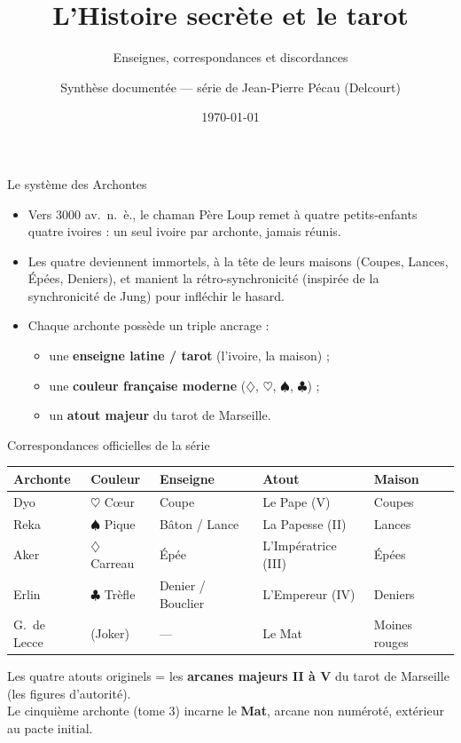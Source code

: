 \documentclass[11pt]{beamer}
\title{L'Histoire secrète et le tarot}
\subtitle{Enseignes, correspondances et discordances}
\author{Synthèse documentée --- série de Jean-Pierre Pécau (Delcourt)}
\date{\today}
\newcommand{\carreau}{\ensuremath{\diamondsuit}}
\newcommand{\coeur}{\ensuremath{\heartsuit}}
\newcommand{\pique}{\ensuremath{\spadesuit}}
\newcommand{\trefle}{\ensuremath{\clubsuit}}
\begin{document}
\begin{frame}
\titlepage
\end{frame}

\begin{frame}{Le système des Archontes}
\begin{itemize}
\item Vers 3000 av.~n.~è., le chaman Père Loup remet à quatre petits-enfants
quatre \og ivoires \fg{} : un seul ivoire par archonte, jamais réunis.
\item Les quatre deviennent immortels, à la tête de leurs \og maisons \fg{}
(Coupes, Lances, Épées, Deniers), et manient la \og rétro-synchronicité \fg{}
(inspirée de la synchronicité de Jung) pour infléchir le hasard.
\item Chaque archonte possède un triple ancrage :
\begin{itemize}
\item une \textbf{enseigne latine / tarot} (l'ivoire, la maison) ;
\item une \textbf{couleur française moderne} (\carreau, \coeur, \pique, \trefle) ;
\item un \textbf{atout majeur} du tarot de Marseille.
\end{itemize}
\end{itemize}
\end{frame}

\begin{frame}{Correspondances officielles de la série}
\begin{center}\small
\begin{tabular}{lllll}
\toprule
\textbf{Archonte} & \textbf{Couleur} & \textbf{Enseigne} & \textbf{Atout} & \textbf{Maison} \\
\midrule
Dyo & \coeur{} Cœur & Coupe & Le Pape (V) & Coupes \\
Reka & \pique{} Pique & Bâton / Lance & La Papesse (II) & Lances \\
Aker & \carreau{} Carreau & Épée & L'Impératrice (III) & Épées \\
Erlin & \trefle{} Trèfle & Denier / Bouclier & L'Empereur (IV) & Deniers \\
\midrule
G.~de Lecce & (Joker) & --- & Le Mat & Moines rouges \\
\bottomrule
\end{tabular}
\end{center}
\vspace{0.4em}
\small Les quatre atouts originels = les \textbf{arcanes majeurs II à V}
du tarot de Marseille (les figures d'autorité).\\
Le cinquième archonte (tome 3) incarne le \textbf{Mat}, arcane non numéroté,
extérieur au pacte initial.
\end{frame}
\end{document}
